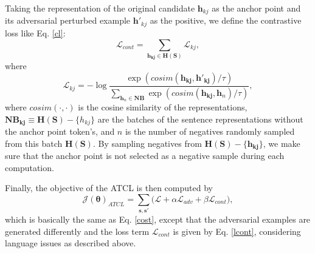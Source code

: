 \documentclass[letterpaper]{article} %
\begin{document}
Taking the representation of the original candidate $\mathbf{h}_{kj}$ as the anchor point and its adversarial perturbed example $\mathbf{h}'_{kj}$ as the positive, we define the contrastive loss like Eq. \ref{cl}:
\begin{equation} 
    \mathcal{L}_{cont} = \sum_{\mathbf{h_{kj}} \in \mathbf{H(S)}} \mathcal{L}_{kj},
\end{equation}
    where
\begin{equation}\label{lcont}
    \mathcal{L}_{kj} = - \log \frac{ \exp(cosim(\mathbf{h_{kj}}, \mathbf{h'_{kj}})/\tau)}{\sum_{\mathbf{h}_n \in \mathbf{NB}} \exp(cosim(\mathbf{h_{kj}}, \mathbf{h}_{n} )/\tau)},
\end{equation}
where $cosim(\cdot ,\cdot )$ is the cosine similarity of the representations, $\mathbf{NB_{kj}} \equiv \mathbf{H(S)}-\{h_{kj}\}$ are the batches of the sentence representations without the anchor point token's, and $n$ is the number of negatives randomly sampled from this batch $\mathbf{H(S)}$. By sampling negatives from $\mathbf{H(S)}-\{\mathbf{h_{kj}}\}$, we make sure that the anchor point is not selected as a negative sample during each computation. 

Finally, the objective of the ATCL is then computed by %
\begin{equation} \label{ofcont}
    \mathcal{J}(\boldsymbol{\theta})_{ATCL} = \sum_{\mathbf{s}, \mathbf{s'}} \bigg( \mathcal{L} + \alpha  \mathcal{L}_{adv} + \beta \mathcal{L}_{cont} \bigg),
\end{equation} 
which is basically the same as Eq. \ref{cost}, except that the adversarial examples are generated differently and the loss term $\mathcal{L}_{cont}$ is given by Eq. \ref{lcont}, considering language issues as described above. 
\end{document}
